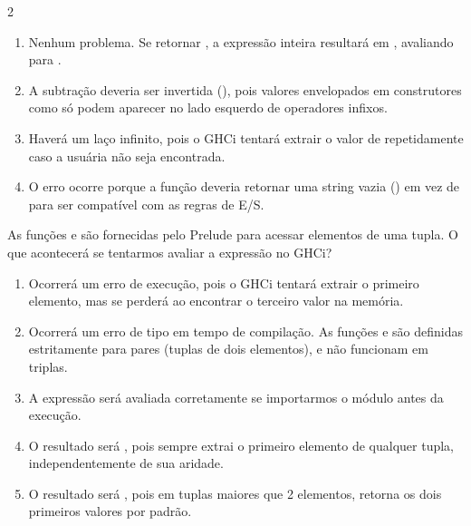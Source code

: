 \documentclass[a4paper,10pt,brazil]{article}
\begin{document}
\begin{multicols}{2}
\begin{enumerate}
  \item Nenhum problema. Se  retornar , a expressão inteira resultará em , avaliando para .

  \item A subtração deveria ser invertida (), pois valores envelopados em construtores como  só podem aparecer no lado esquerdo de operadores infixos.

  \item Haverá um laço infinito, pois o GHCi tentará extrair o valor de  repetidamente caso a usuária não seja encontrada.

  \item O erro ocorre porque a função  deveria retornar uma string vazia () em vez de  para ser compatível com as regras de E/S.


\end{enumerate}

As funções  e  são fornecidas pelo Prelude para acessar elementos de uma tupla. O que acontecerá se tentarmos avaliar a expressão  no GHCi?

\begin{enumerate}
  \item Ocorrerá um erro de execução, pois o GHCi tentará extrair o primeiro elemento, mas se perderá ao encontrar o terceiro valor na memória.

  \item Ocorrerá um erro de tipo em tempo de compilação. As funções  e  são definidas estritamente para pares (tuplas de dois elementos), e não funcionam em triplas.

  \item A expressão será avaliada corretamente se importarmos o módulo  antes da execução.

  \item O resultado será , pois  sempre extrai o primeiro elemento de qualquer tupla, independentemente de sua aridade.

  \item O resultado será , pois em tuplas maiores que 2 elementos,  retorna os dois primeiros valores por padrão.



\end{enumerate}
\end{multicols}
\end{document}
